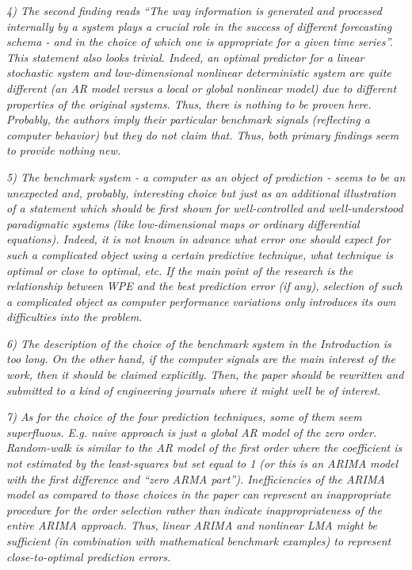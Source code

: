 \documentclass[12pt]{article}
\begin{document}
\emph{4) The second finding reads ``The way information is generated and
processed internally by a system plays a crucial role in the success of
different forecasting schema - and in the choice of which one is appropriate for
a given time series''. This statement also looks trivial. Indeed, an optimal
predictor for a linear stochastic system and low-dimensional nonlinear
deterministic system are quite different (an AR model versus a local or global
nonlinear model) due to different properties of the original systems. Thus,
there is nothing to be proven here. Probably, the authors imply their particular
benchmark signals (reflecting a computer behavior) but they do not claim that.
Thus, both primary findings seem to provide nothing new.}

\emph{5) The benchmark system - a computer as an object of prediction - seems to
be an unexpected and, probably, interesting choice but just as an additional
illustration of a statement which should be first shown for well-controlled and
well-understood paradigmatic systems (like low-dimensional maps or ordinary
differential equations). Indeed, it is not known in advance what error one
should expect for such a complicated object using a certain predictive
technique, what technique is optimal or close to optimal, etc. If the main point
of the research is the relationship between WPE and the best prediction error
(if any), selection of such a complicated object as computer performance
variations only introduces its own difficulties into the problem.}

\emph{6) The description of the choice of the benchmark system in the
Introduction is too long. On the other hand, if the computer signals are the
main interest of the work, then it should be claimed explicitly. Then, the paper
should be rewritten and submitted to a kind of engineering journals where it
might well be of interest.}

\emph{7) As for the choice of the four prediction techniques, some of them seem
superfluous. E.g. naive approach is just a global AR model of the zero order.
Random-walk is similar to the AR model of the first order where the coefficient
is not estimated by the least-squares but set equal to 1 (or this is an ARIMA
model with the first difference and ``zero ARMA part''). Inefficiencies of the
ARIMA model as compared to those choices in the paper can represent an
inappropriate procedure for the order selection rather than indicate
inappropriateness of the entire ARIMA approach. Thus, linear ARIMA and nonlinear
LMA might be sufficient (in combination with mathematical benchmark examples) to
represent close-to-optimal prediction errors.}
\end{document}
